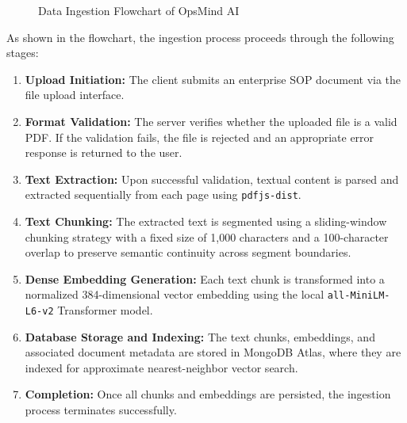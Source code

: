 \begin{figure}[H]
\caption{Data Ingestion Flowchart of OpsMind AI}
\label{fig:data_ingestion_flowchart}
\end{figure}

As shown in the flowchart, the ingestion process proceeds through the following stages:
\begin{enumerate}
    \item \textbf{Upload Initiation:} The client submits an enterprise SOP document via the file upload interface.
    \item \textbf{Format Validation:} The server verifies whether the uploaded file is a valid PDF. If the validation fails, the file is rejected and an appropriate error response is returned to the user.
    \item \textbf{Text Extraction:} Upon successful validation, textual content is parsed and extracted sequentially from each page using \texttt{pdfjs-dist}.
    \item \textbf{Text Chunking:} The extracted text is segmented using a sliding-window chunking strategy with a fixed size of 1,000 characters and a 100-character overlap to preserve semantic continuity across segment boundaries.
    \item \textbf{Dense Embedding Generation:} Each text chunk is transformed into a normalized 384-dimensional vector embedding using the local \texttt{all-MiniLM-L6-v2} Transformer model.
    \item \textbf{Database Storage and Indexing:} The text chunks, embeddings, and associated document metadata are stored in MongoDB Atlas, where they are indexed for approximate nearest-neighbor vector search.
    \item \textbf{Completion:} Once all chunks and embeddings are persisted, the ingestion process terminates successfully.
\end{enumerate}


